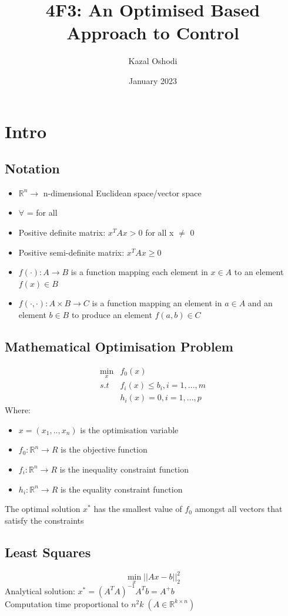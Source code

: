 \documentclass{article}
\title{4F3: An Optimised Based Approach to Control}
\author{Kazal Oshodi }
\date{January 2023}
\begin{document}
\maketitle
\tableofcontents
\pagebreak
\section{Intro}
\subsection{Notation}
\begin{itemize}
    \item $\mathbb{R}^n \rightarrow$ n-dimensional Euclidean space/vector space
    \item $\forall$ = for all
    \item Positive definite matrix: $x^TA x > 0$ for all x $\neq$ 0
    \item Positive semi-definite matrix: $x^T A x \geq 0$
    \item $f(\cdot) : A \rightarrow B$ is a function mapping each element in $x \in A$ to an element $f(x) \in B$
    \item $f(\cdot, \cdot) : A \times B \rightarrow C$ is a function mapping an element in $a \in A$ and an element $b \in B$ to produce an element $f(a,b) \in C$
\end{itemize}
\subsection{Mathematical Optimisation Problem}
\[
\begin{aligned}
\min_x &f_0(x) \\ s.t \; &f_i(x) \leq b_i,i=1,...,m \\ &h_i(x) = 0, i=1,...,p
\end{aligned}
\]
Where:
\begin{itemize}
    \item $x = (x_1,..,x_n)$ is the optimisation variable
    \item $f_0 : \mathbb{R}^n \rightarrow R$ is the objective function
    \item $f_i : \mathbb{R}^n \rightarrow R$  is the inequality constraint function
    \item $h_i : \mathbb{R}^n \rightarrow R$ is the equality constraint function
\end{itemize}
The optimal solution $x^*$ has the smallest value of $f_0$ amongst all vectors that satisfy the constraints
\subsection{Least Squares}
\[
\min_x ||Ax-b||_2^2
\]
Analytical solution: $x^* = (A^T A)^{-1} A^T b = A^+ b$
\\ Computation time proportional to $n^2 k \; (A \in \mathbb{R}^{k \times n})$ 
\end{document}
